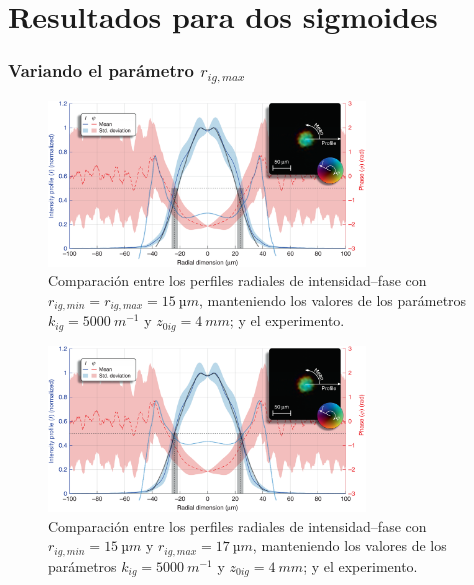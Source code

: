 \chapter{Resultados para dos sigmoides}\label{anx:2}
\subsection*{Variando el parámetro $r_{ig,max}$}

\begin{figure}[htbp]
  \centering
  \includegraphics[width=0.75\textwidth]{Figuras/anx_cmp_51.png}
  \caption*{Comparación entre los perfiles radiales de intensidad--fase con $r_{ig,min}=r_{ig,max}=\qty{15}{µm}$, manteniendo los valores de los parámetros $k_{ig}=\qty{5000}{m^{-1}}$ y $z_{0ig}=\qty{4}{mm}$; y el experimento.}
\end{figure}

\begin{figure}[htbp]
  \centering
  \includegraphics[width=0.75\textwidth]{Figuras/anx_cmp_52.png}
  \caption*{Comparación entre los perfiles radiales de intensidad--fase con $r_{ig,min}=\qty{15}{µm}$ y $r_{ig,max}=\qty{17}{µm}$, manteniendo los valores de los parámetros $k_{ig}=\qty{5000}{m^{-1}}$ y $z_{0ig}=\qty{4}{mm}$; y el experimento.}
\end{figure}


